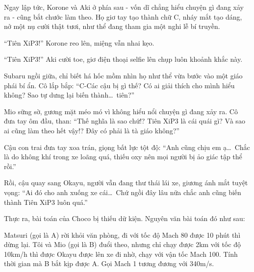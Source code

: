 \documentclass[../main.tex]{subfiles}
\begin{document}

Ngay lập tức, Korone và Aki ở phía sau - vốn dĩ chẳng hiểu chuyện gì đang xảy ra - cũng bắt chước làm theo. Họ giơ tay tạo thành chữ C, nháy mắt tạo dáng, nở một nụ cười thật tươi, như thể đang tham gia một nghi lễ bí truyền.

``Tiên XiP3!'' Korone reo lên, miệng vẫn nhai kẹo.

``Tiên XiP3!'' Aki cười toe, giơ điện thoại selfie lên chụp luôn khoảnh khắc này.

Subaru ngồi giữa, chỉ biết há hốc mồm nhìn họ như thể vừa bước vào một giáo phái bí ẩn. Cô lắp bắp: ``C-Các cậu bị gì thế? Có ai giải thích cho mình hiểu không? Sao tự dưng lại biến thành\dots\ tiên?''

Mio sững sờ, gương mặt méo mó vì không hiểu nổi chuyện gì đang xảy ra. Cô đưa tay ôm đầu, than: ``Thế nghĩa là sao chứ!? Tiên XiP3 là cái quái gì? Và sao ai cũng làm theo hết vậy!? Đây có phải là tà giáo không?''

Cậu con trai đưa tay xoa trán, giọng bất lực tột độ: ``Anh cũng chịu em ạ\dots\ Chắc là do không khí trong xe loãng quá, thiếu oxy nên mọi người bị ảo giác tập thể rồi.''

Rồi, cậu quay sang Okayu, người vẫn đang thư thái lái xe, giương ánh mắt tuyệt vọng: ``Ai đó cho anh xuống xe cái\dots\ Chứ ngồi đây lâu nữa chắc anh cũng biến thành Tiên XiP3 luôn quá.''

\omk


Thực ra, bài toán của Choco bị thiếu dữ kiện. Nguyên văn bài toán đó như sau:

\begin{tcolorbox}[
    colframe=vol,    %
    colback=white,   %
    boxrule=0.5pt,   %
    arc=0mm,         %
    left=5pt,        %
    right=5pt,       %
    top=5pt,         %
    bottom=5pt       %
  ]
  Matsuri (gọi là A) rời khỏi văn phòng, đi với tốc độ Mach 80 được 10 phút thì dừng lại. Tôi và Mio (gọi là B) đuổi theo, nhưng chỉ chạy được 2km với tốc độ 10km/h thì được Okayu được lên xe đi nhờ, chạy với vận tốc Mach 100. Tính thời gian mà B bắt kịp được A. Gọi Mach 1 tương đương với 340m/s.
\end{tcolorbox}
\end{document}
